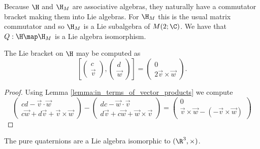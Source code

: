 \documentclass[oneside,12pt]{amsart}
\begin{document}
 Because $\H$ and $\H_M$ are associative algebras, they naturally have a commutator bracket
 making them into Lie algebras. For $\H_M$ this is the usual matrix commutator and so
 $\H_M$ is a Lie subalgebra of $M(2; \C)$. We have that $Q:\H\map\H_M$ is a Lie algebra isomorphism.

\begin{lemma}
\label{lemma:bracket_in_terms_of_vector_products}
The Lie bracket on $\H$ may be computed as
$$
\left[
\begin{pmatrix}
c\\
\vec{v}
\end{pmatrix},
\begin{pmatrix}
d\\
\vec{w}
\end{pmatrix}
\right]
=
\begin{pmatrix}
0 \\
2\vec{v}\times \vec{w}
\end{pmatrix}.
$$
\end{lemma}
\begin{proof}
Using Lemma \ref{lemma:in_terms_of_vector_products} we compute
$$
\begin{pmatrix}
cd - \vec{v} \cdot \vec{w} \\
c\vec{w} + d\vec{v} + \vec{v}\times \vec{w}
\end{pmatrix}
-
\begin{pmatrix}
dc - \vec{w} \cdot \vec{v} \\
d\vec{v} + c\vec{w} + \vec{w}\times \vec{v}
\end{pmatrix}
=
\begin{pmatrix}
0 \\
 \vec{v}\times \vec{w} - (-\vec{v}\times \vec{w})
\end{pmatrix}
$$
\end{proof}

\begin{corollary}
The pure quaternions are a Lie algebra isomorphic to $(\R^3, \times)$.
\end{corollary} 
\end{document}
